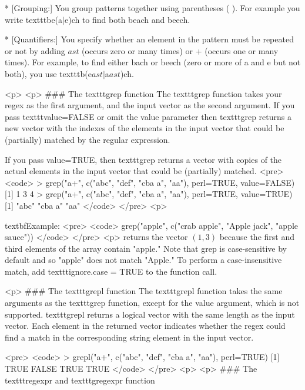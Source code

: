 
        * [Grouping:] You group patterns together using parentheses ( ). For example you write texttt{be(a$|$e)ch} to find both beach and beech.

        * [Quantifiers:] You specify whether an element in the pattern must be repeated or not by adding $ast$ (occurs zero or many times) or + (occurs one or many times). For example, to find either bach or beech (zero or more of a and e but not both), you use texttt{b(e$ast |$a$ast$)ch}.


<p>
<p>
### {The texttt{grep} function }
The texttt{grep} function takes your regex as the first argument, and the input vector as the second argument. If you pass texttt{value=FALSE} or omit the value parameter then texttt{grep}  returns a new vector with the indexes of the elements in the input vector that could be (partially) matched by the regular expression. 

If you pass value=TRUE, then texttt{grep}  returns a vector with copies of the actual elements in the input vector that could be (partially) matched.
<pre>
<code>
> grep("a+", c("abc", "def", "cba a", "aa"), perl=TRUE, value=FALSE)
[1] 1     3       4
> grep("a+", c("abc", "def", "cba a", "aa"), perl=TRUE, value=TRUE)
[1] "abc" "cba a" "aa"
</code>
</pre>
<p>

textbf{Example:}
<pre>
<code>
grep("apple", c("crab apple", "Apple jack", "apple sauce"))
</code>
</pre>
<p>
returns the vector $(1, 3)$ because the first and third elements of the array contain "apple." Note that grep is case-sensitive by default and so "apple" does not match "Apple." To perform a case-insensitive match, add texttt{ignore.case = TRUE} to the function call.

<p>
### {The texttt{grepl} function }
The texttt{grepl} function takes the same arguments as the texttt{grep}  function, except for the value argument, which is not supported. texttt{grepl} returns a logical vector with the same length as the input vector. Each element in the returned vector indicates whether the regex could find a match in the corresponding string element in the input vector.

<pre>
<code>
> grepl("a+", c("abc", "def", "cba a", "aa"), perl=TRUE)
[1] TRUE  FALSE TRUE  TRUE
</code>
</pre>
<p>
<p>
### {The texttt{regexpr} and texttt{gregexpr} function }

